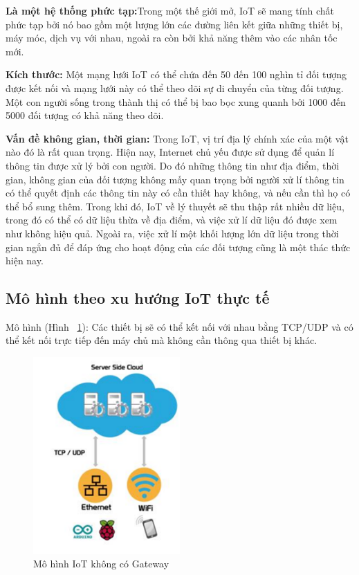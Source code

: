 \textbf{Là một hệ thống phức tạp:}Trong một thế giới mở, IoT sẽ mang tính chất phức tạp bởi nó bao gồm một lượng lớn các đường liên kết giữa những thiết bị, máy móc, dịch vụ với nhau, ngoài ra còn bởi khả năng thêm vào các nhân tốc mới.

\textbf{Kích thước: } Một mạng lưới IoT có thể chứa đến 50 đến 100 nghìn tỉ đối tượng được kết nối và mạng lưới này có thể theo dõi sự di chuyển của từng đối tượng. Một con người sống trong thành thị có thể bị bao bọc xung quanh bởi 1000 đến 5000 đối tượng có khả năng theo dõi.

\textbf{Vấn đề không gian, thời gian: }Trong IoT, vị trí địa lý chính xác của một vật nào đó là rất quan trọng. Hiện nay, Internet chủ yếu được sử dụng để quản lí thông tin được xử lý bởi con người. Do đó những thông tin như địa điểm, thời gian, không gian của đối tượng không mấy quan trọng bởi người xử lí thông tin có thể quyết định các thông tin này có cần thiết hay không, và nếu cần thì họ có thể bổ sung thêm. Trong khi đó, IoT về lý thuyết sẽ thu thập rất nhiều dữ liệu, trong đó có thể có dữ liệu thừa về địa điểm, và việc xử lí dữ liệu đó được xem như không hiệu quả. Ngoài ra, việc xử lí một khối lượng lớn dữ liệu trong thời gian ngắn đủ để đáp ứng cho hoạt động của các đối tượng cũng là một thác thức hiện nay.

\newpage

\subsection*{Mô hình theo xu hướng IoT thực tế}
Mô hình (Hình ~\ref{fig:pic5}): Các thiết bị sẽ có thể kết nối với nhau bằng TCP/UDP và có thể kết nối trực tiếp đến máy chủ mà không cần thông qua thiết bị khác.

\begin{figure}[H] 
\centering    
\includegraphics[width=0.5\textwidth]{pic5}
\caption[Mô hình IoT không có Gateway ]{Mô hình IoT không có Gateway}
\label{fig:pic5}
\end{figure}


